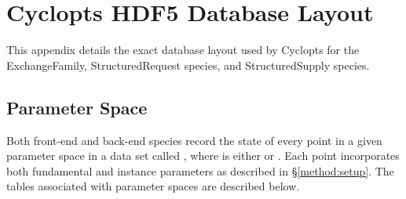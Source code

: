 \chapter{Cyclopts HDF5 Database Layout}\label{app:hdf5}

This appendix details the exact database layout used by Cyclopts for the
ExchangeFamily, StructuredRequest species, and StructuredSupply species.

\section{Parameter Space}

Both front-end and back-end species record the state of every point in a given
parameter space in a data set called ,
where  is either  or
. Each point incorporates both fundamental and instance
parameters as described in \S \ref{method:setup}. The tables associated with
parameter spaces are described below.

